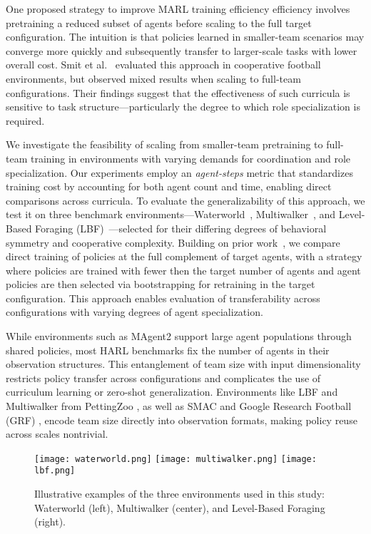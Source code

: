 \documentclass{article}
\begin{document}
One proposed strategy to improve MARL training efficiency efficiency involves pretraining 
a reduced subset of agents before scaling to the full target configuration. 
The intuition is that policies learned in smaller-team scenarios may converge 
more quickly and subsequently transfer to larger-scale tasks with lower overall cost. 
Smit et al.~\cite{smit2023} evaluated this approach in cooperative football environments, 
but observed mixed results when scaling to full-team configurations. Their findings 
suggest that the effectiveness of such curricula is sensitive to task structure—particularly 
the degree to which role specialization is required.

We investigate the feasibility of scaling from smaller-team pretraining to full-team 
training in environments with varying demands for coordination and role specialization.
Our experiments employ an \emph{agent-steps} metric that standardizes training cost by 
accounting for both agent count and time, enabling direct comparisons across curricula. 
To evaluate the generalizability of this approach, we test it on three benchmark 
environments—Waterworld~\cite{gupta2017}, Multiwalker~\cite{gupta2017}, 
and Level-Based Foraging (LBF)~\cite{papoudakis2021}—selected for their 
differing degrees of behavioral symmetry and cooperative complexity. 
Building on prior work~\cite{smit2023}, we compare 
direct training of policies at the full complement of target agents, with a strategy 
where policies are trained with fewer then the target number of agents and agent 
policies are then selected via bootstrapping for retraining in the target configuration.
This approach enables evaluation of transferability across configurations with 
varying degrees of agent specialization.

While environments such as MAgent2 \cite{zheng2017} support large agent populations through 
shared policies, most HARL benchmarks fix the number of agents in their observation structures. 
This entanglement of team size with input dimensionality restricts policy transfer across 
configurations and complicates the use of curriculum learning or zero-shot generalization. 
Environments like LBF and Multiwalker from PettingZoo \cite{terry2021}, as well as 
SMAC \cite{samvelyan2019} and Google Research Football (GRF) \cite{kurach2020}, 
encode team size directly into observation formats, making policy reuse across scales nontrivial.


\begin{figure}[h]
    \centering
    \texttt{[image: waterworld.png]}
    \hfill
    \texttt{[image: multiwalker.png]}
    \hfill
    \texttt{[image: lbf.png]}
    \caption{Illustrative examples of the three environments used in this study: 
        Waterworld (left), Multiwalker (center), and Level-Based Foraging (right).}
    \label{fig:envs-overview}
\end{figure}
\end{document}
